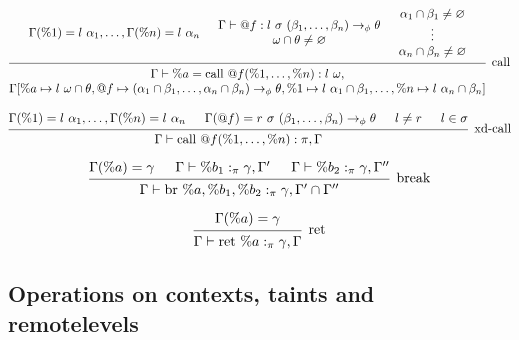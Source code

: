 \documentclass{article}
\begin{document}
\[
\begin{prooftree}
    \hypo{\Gamma(\%1) = l\ \alpha_1, \dots, \Gamma(\%n) = l\ \alpha_n}
    \hypo{
        \begin{matrix}
            \Gamma \vdash @f : l\ \sigma\ (\beta_1, \dots, \beta_n) \rightarrow_\phi \theta \\
            \omega \cap \theta \neq \varnothing
        \end{matrix}}
    \hypo{
        \begin{matrix}
        \alpha_1 \cap \beta_1 \neq \varnothing \\
        \vdots \\
        \alpha_n \cap \beta_n \neq \varnothing
        \end{matrix}
    }
    \infer3[call]{
    \begin{matrix}
        \Gamma \vdash \%a = \text{call } @f(\%1, \dots, \%n) : l\ \omega, \\
        \Gamma[\%a \mapsto l\ \omega \cap \theta, @f \mapsto (\alpha_1 \cap \beta_1, \dots, \alpha_n \cap \beta_n) \rightarrow_\phi \theta, \%1 \mapsto l\ \alpha_1 \cap \beta_1, \dots, \%n \mapsto l\ \alpha_n \cap \beta_n]
    \end{matrix}}
\end{prooftree}
\]

\[
\begin{prooftree}
    \hypo{\Gamma(\%1) = l\ \alpha_1, \dots, \Gamma(\%n) = l\ \alpha_n}
    \hypo{\Gamma(@f) = r\ \sigma\ (\beta_1, \dots, \beta_n) \rightarrow_\phi \theta}
    \hypo{l \neq r}
    \hypo{l \in \sigma}
    \infer4[xd-call]{\Gamma \vdash \text{call } @f(\%1, \dots, \%n) : \pi, \Gamma}
\end{prooftree}
\]

\[
\begin{prooftree}
    \hypo{\Gamma(\%a) = \gamma}
    \hypo{\Gamma \vdash \%b_1 :_\pi \gamma, \Gamma'} 
    \hypo{\Gamma \vdash \%b_2 :_\pi \gamma, \Gamma''} 
    \infer3[break]{\Gamma \vdash \text{br }\%a, \%b_1, \%b_2 :_\pi \gamma, \Gamma' \cap \Gamma''}
\end{prooftree}
\]

\[
\begin{prooftree}
    \hypo{\Gamma(\%a) = \gamma}
    \infer1[ret]{\Gamma \vdash \text{ret }\%a :_\pi \gamma, \Gamma}
\end{prooftree}
\]

\subsection{Operations on contexts, taints and remotelevels }
\end{document}
